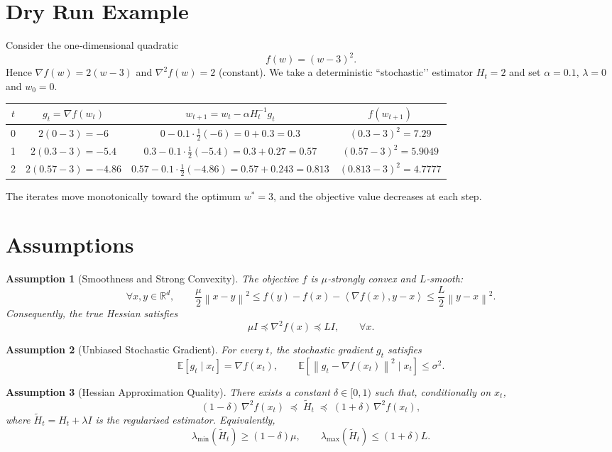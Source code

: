 \documentclass[11pt]{article}
\newtheorem{assumption}{Assumption}
\newcommand{\E}{\mathbb{E}}
\newcommand{\R}{\mathbb{R}}
\newcommand{\norm}[1]{\left\|#1\right\|}
\newcommand{\ip}[2]{\left\langle #1,#2\right\rangle}
\newcommand{\grad}{\nabla}
\newcommand{\Hess}{\nabla^{2}}
\begin{document}
\section*{Dry Run Example}
Consider the one‑dimensional quadratic
\[
f(w)=(w-3)^{2}.
\]
Hence $\grad f(w)=2(w-3)$ and $\Hess f(w)=2$ (constant).  
We take a deterministic “stochastic’’ estimator $H_{t}=2$ and set
$\alpha=0.1$, $\lambda=0$ and $w_{0}=0$.

\begin{center}
\begin{tabular}{c|c|c|c}
$t$ & $g_{t}= \grad f(w_{t})$ & $w_{t+1}=w_{t}-\alpha H_{t}^{-1}g_{t}$ & $f(w_{t+1})$\\\hline
0 & $2(0-3)=-6$ & $0-0.1\cdot\frac{1}{2}(-6)=0+0.3=0.3$ & $(0.3-3)^{2}=7.29$\\
1 & $2(0.3-3)=-5.4$ & $0.3-0.1\cdot\frac{1}{2}(-5.4)=0.3+0.27=0.57$ & $(0.57-3)^{2}=5.9049$\\
2 & $2(0.57-3)=-4.86$ & $0.57-0.1\cdot\frac{1}{2}(-4.86)=0.57+0.243=0.813$ & $(0.813-3)^{2}=4.7777$
\end{tabular}
\end{center}
The iterates move monotonically toward the optimum $w^{*}=3$, and the objective value decreases at each step.

\section*{Assumptions}
\begin{assumption}[Smoothness and Strong Convexity]\label{as:sc}
The objective $f$ is $\mu$‑strongly convex and $L$‑smooth:
\[
\forall x,y\in\R^{d},\qquad 
\frac{\mu}{2}\norm{x-y}^{2}\le f(y)-f(x)-\ip{\grad f(x)}{y-x}\le\frac{L}{2}\norm{y-x}^{2}.
\]
Consequently, the true Hessian satisfies
\[
\mu I\preceq \Hess f(x)\preceq L I,\qquad\forall x.
\]
\end{assumption}

\begin{assumption}[Unbiased Stochastic Gradient]\label{as:grad}
For every $t$, the stochastic gradient $g_{t}$ satisfies
\[
\E\!\left[g_{t}\mid x_{t}\right]=\grad f(x_{t}),\qquad
\E\!\left[\norm{g_{t}-\grad f(x_{t})}^{2}\mid x_{t}\right]\le\sigma^{2}.
\]
\end{assumption}

\begin{assumption}[Hessian Approximation Quality]\label{as:hess}
There exists a constant $\delta\in[0,1)$ such that, conditionally on $x_{t}$,
\[
(1-\delta)\,\Hess f(x_{t})\;\preceq\;\widetilde H_{t}\;\preceq\;(1+\delta)\,\Hess f(x_{t}),
\]
where $\widetilde H_{t}=H_{t}+\lambda I$ is the regularised estimator.
Equivalently,
\[
\lambda_{\min}(\widetilde H_{t})\ge (1-\delta)\mu,\qquad
\lambda_{\max}(\widetilde H_{t})\le (1+\delta)L .
\]
\end{assumption}
\end{document}

